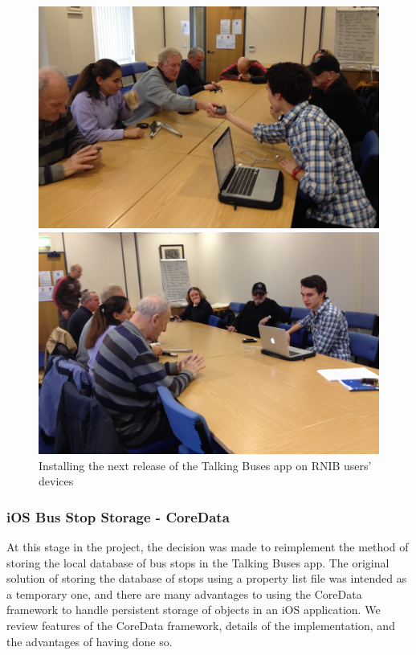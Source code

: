\documentclass[10pt,twocolumn]{article}
\begin{document}
\begin{figure}[htbp]
    \begin{minipage}[b]{0.5\linewidth}
        \centering
        \includegraphics[width=\linewidth]{group}
    \end{minipage}
    \hspace{0.5cm}
    \begin{minipage}[b]{0.5\linewidth}
        \centering
        \includegraphics[width=\linewidth]{group2}
    \end{minipage}
    \caption{Installing the next release of the Talking Buses app on RNIB users' devices}
\end{figure}

\subsubsection{iOS Bus Stop Storage - CoreData}
At this stage in the project, the decision was made to reimplement the method of storing the local database of bus stops in the Talking Buses app. The original solution of storing the database of stops using a property list file was intended as a temporary one, and there are many advantages to using the CoreData framework to handle persistent storage of objects in an iOS application. We review features of the CoreData framework, details of the implementation, and the advantages of having done so.
\end{document}
